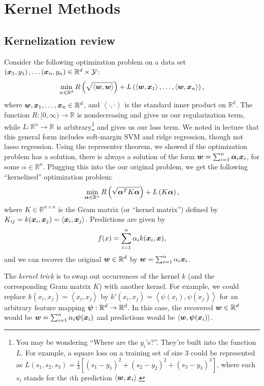 \documentclass{article}
\theoremstyle{plain}
\theoremstyle{definition}
\begin{document}
\section{\large Kernel Methods}

\subsection{Kernelization review}

Consider the following optimization problem on a data set $\left(\boldsymbol{x}_{1},y_{1}\right),\ldots\left(\boldsymbol{x}_{n},y_{n}\right)\in\mathbb{R}^{d}\times\mathcal{Y}$:
\[
\min_{w\in\mathbb{R}^{d}}R\left(\sqrt{\left\langle \boldsymbol{w},\boldsymbol{w}\right\rangle }\right)+L\left(\left\langle \boldsymbol{w},\boldsymbol{x}_{1}\right\rangle ,\ldots,\left\langle \boldsymbol{w},\boldsymbol{x}_{n}\right\rangle \right),
\]
where $\boldsymbol{w},\boldsymbol{x}_{1},\ldots,\boldsymbol{x}_{n}\in\mathbb{R}^{d}$, and $\left\langle \cdot,\cdot\right\rangle $
is the standard inner product on $\mathbb{R}^{d}$. The function $R:[0,\infty)\to\mathbb{R}$
is nondecreasing and gives us our regularization term, while $L:\mathbb{R}^{n}\to\mathbb{R}$ is arbitrary\footnote{You may be wondering ``Where are the $y_{i}$'s?''. They're built
into the function $L$. For example, a square loss on a training set
of size $3$ could be represented as $L(s_{1},s_{2},s_{3})=\frac{1}{3}\left[\left(s_{1}-y_{1}\right)^{2}+\left(s_{2}-y_{2}\right)^{2}+\left(s_{3}-y_{3}\right)^{3}\right]$,
where each $s_{i}$ stands for the $i$th prediction $\left\langle \boldsymbol{w}, \boldsymbol{x}_{i}\right\rangle $. } and gives us our loss term. We noted in lecture that this general
form includes soft-margin SVM and ridge regression, though not lasso
regression. Using the representer theorem, we showed if the optimization
problem has a solution, there is always a solution of the form $\boldsymbol{w}=\sum_{i=1}^{n}\boldsymbol{\alpha}_{i} \boldsymbol{x}_{i}$,
for some $\alpha\in\mathbb{R}^{n}$. Plugging this into the our original
problem, we get the following ``kernelized'' optimization problem:
\[
\min_{\boldsymbol{\alpha}\in\mathbb{R}^{n}}R\left(\sqrt{\boldsymbol{\alpha}^{T}K \boldsymbol{\alpha}}\right)+L\left(K\boldsymbol{\alpha}\right),
\]
where $K\in\mathbb{R}^{n\times n}$ is the Gram matrix (or ``kernel matrix'')
defined by $K_{ij}=k(\boldsymbol{x}_{i},\boldsymbol{x}_{j})=\left\langle \boldsymbol{x}_{i}, \boldsymbol{x}_{j}\right\rangle $.
Predictions are given by
\[
f(x)=\sum_{i=1}^{n} \alpha_{i}k(\boldsymbol{x}_{i}, \boldsymbol{x}),
\]
and we can recover the original $\boldsymbol{w}\in\mathbb{R}^{d}$ by $\boldsymbol{w}=\sum_{i=1}^{n}\alpha_{i} \boldsymbol{x}_{i}$.

The \emph{kernel trick} is to swap out occurrences of the
kernel $k$ (and the corresponding Gram matrix $K$) with another
kernel. For example, we could replace $k(x_{i},x_{j})=\left\langle x_{i},x_{j}\right\rangle $
by $k'(x_{i},x_{j})=\left\langle \psi(x_{i}),\psi(x_{j})\right\rangle $
for an arbitrary feature mapping $\boldsymbol{\psi}:\mathbb{R}^{d}\to\mathbb{R}^{d}$.
In this case, the recovered $\boldsymbol{w}\in\mathbb{R}^{d}$ would be $\boldsymbol{w}=\sum_{i=1}^{n}\alpha_{i}\boldsymbol{\psi}(\boldsymbol{x}_{i})$
and predictions would be $\left\langle \boldsymbol{w}, \boldsymbol{\psi}(\boldsymbol{x}_{i})\right\rangle $\@.
\end{document}
